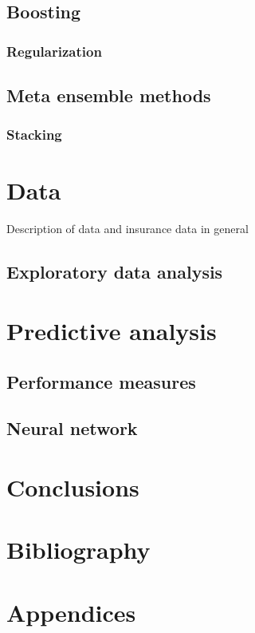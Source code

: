 \documentclass[]{article}
\begin{document}
\subsection{Boosting}\label{boosting}

\subsubsection{Regularization}\label{regularization-1}

\subsection{Meta ensemble methods}\label{meta-ensemble-methods}

\subsubsection{Stacking}\label{stacking}

\section{Data}\label{data}

Description of data and insurance data in general

\subsection{Exploratory data analysis}\label{exploratory-data-analysis}

\section{Predictive analysis}\label{predictive-analysis}

\subsection{Performance measures}\label{performance-measures}

\subsection{Neural network}\label{neural-network}

\section{Conclusions}\label{conclusions}

\section{Bibliography}\label{bibliography}

\section{Appendices}\label{appendices}


\end{document}
